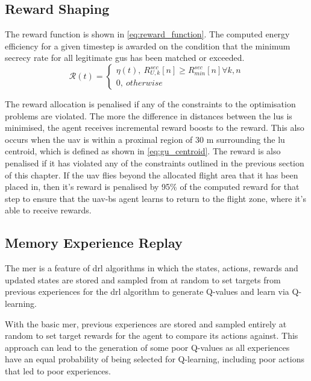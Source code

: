 \subsection{Reward Shaping}
The reward function is shown in \ref{eq:reward_function}. The computed energy efficiency for a given timestep is awarded on the condition that the minimum secrecy rate for all legitimate \acrshort{gu}s has been matched or exceeded.
\begin{equation}\label{eq:reward_function}
   \mathcal{R}(t) = \begin{cases}
       \eta (t),\ R_{U, k}^{sec} [n] \ge R_{min}^{sec} [n] \forall k, n \\
       0,\ otherwise
   \end{cases} 
\end{equation}

The reward allocation is penalised if any of the constraints to the optimisation problems are violated. 
The more the difference in distances between the \acrshort{lu}s is minimised, the agent receives incremental reward boosts to the reward. 
This also occurs when the \acrshort{uav} is within a proximal region of 30 m surrounding the \acrshort{lu} centroid, which is defined as shown in \ref{eq:gu_centroid}. 
The reward is also penalised if it has violated any of the constraints outlined in the previous section of this chapter. 
If the \acrshort{uav} flies beyond the allocated flight area that it has been placed in, then it's reward is penalised by 95\% of the computed reward for that step to ensure that the \acrshort{uav}-\acrshort{bs} agent learns to return to the flight zone, where it's able to receive rewards. 
\subsection{Memory Experience Replay}
The \acrshort{mer} is a feature of \acrshort{drl} algorithms in which the states, actions, rewards and updated states are stored and sampled from at random to set targets from previous experiences for the \acrshort{drl} algorithm to generate Q-values and learn via Q-learning. 

With the basic \acrshort{mer}, previous experiences are stored and sampled entirely at random to set target rewards for the agent to compare its actions against. 
This approach can lead to the generation of some poor Q-values as all experiences have an equal probability of being selected for Q-learning, including poor actions that led to poor experiences. 

